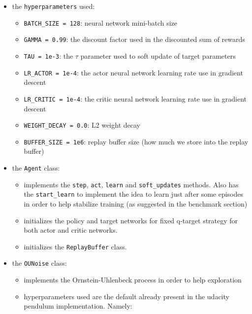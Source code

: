 \documentclass[
]{article}
\providecommand{\tightlist}{%
  \setlength{\itemsep}{0pt}\setlength{\parskip}{0pt}}
\begin{document}
\begin{itemize}
\tightlist
\item
  the \texttt{hyperparameters} used:

  \begin{itemize}
  \tightlist
  \item
    \texttt{BATCH\_SIZE\ =\ 128}: neural network mini-batch size
  \item
    \texttt{GAMMA\ =\ 0.99}: the discount factor used in the discounted
    sum of rewards
  \item
    \texttt{TAU\ =\ 1e-3}: the \(\tau\) parameter used to soft update of
    target parameters
  \item
    \texttt{LR\_ACTOR\ =\ 1e-4}: the actor neural network learning rate
    use in gradient descent
  \item
    \texttt{LR\_CRITIC\ =\ 1e-4}: the critic neural network learning
    rate use in gradient descent
  \item
    \texttt{WEIGHT\_DECAY\ =\ 0.0}: L2 weight decay
  \item
    \texttt{BUFFER\_SIZE\ =\ 1e6}: replay buffer size (how much we store
    into the replay buffer)
  \end{itemize}
\item
  the \texttt{Agent} class:

  \begin{itemize}
  \tightlist
  \item
    implements the \texttt{step}, \texttt{act}, \texttt{learn} and
    \texttt{soft\_updates} methods. Also has the \texttt{start\_learn}
    to implement the idea to learn just after some episodes in order to
    help stabilize training (as suggested in the benchmark section)
  \item
    initializes the policy and target networks for fixed q-target
    strategy for both actor and critic networks.
  \item
    initializes the \texttt{ReplayBuffer} class.
  \end{itemize}
\item
  the \texttt{OUNoise} class:

  \begin{itemize}
  \tightlist
  \item
    implements the Ornstein-Uhlenbeck process in order to help
    exploration
  \item
    hyperparameters used are the default already present in the udacity
    pendulum implementation. Namely:


\end{itemize}
\end{itemize}
\end{document}
